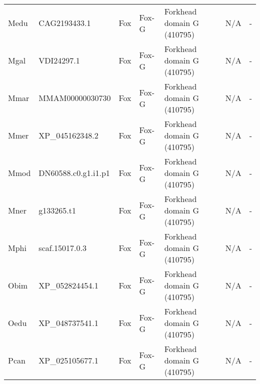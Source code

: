 \documentclass[../main.tex]{subfiles}
\begin{document}
\begin{landscape}
\begin{longtable}{lllllll}
		Medu           & CAG2193433.1          & Fox            & Fox-G               & Forkhead domain G (410795)                  & N/A                                                                    & -                    \\
		Mgal           & VDI24297.1            & Fox            & Fox-G               & Forkhead domain G (410795)                  & N/A                                                                    & -                    \\
		Mmar           & MMAM00000030730       & Fox            & Fox-G               & Forkhead domain G (410795)                  & N/A                                                                    & -                    \\
		Mmer           & XP\_045162348.2       & Fox            & Fox-G               & Forkhead domain G (410795)                  & N/A                                                                    & -                    \\
		Mmod           & DN60588.c0.g1.i1.p1   & Fox            & Fox-G               & Forkhead domain G (410795)                  & N/A                                                                    & -                    \\
		Mner           & g133265.t1            & Fox            & Fox-G               & Forkhead domain G (410795)                  & N/A                                                                    & -                    \\
		Mphi           & scaf.15017.0.3        & Fox            & Fox-G               & Forkhead domain G (410795)                  & N/A                                                                    & -                    \\
		Obim           & XP\_052824454.1       & Fox            & Fox-G               & Forkhead domain G (410795)                  & N/A                                                                    & -                    \\
		Oedu           & XP\_048737541.1       & Fox            & Fox-G               & Forkhead domain G (410795)                  & N/A                                                                    & -                    \\
		Pcan           & XP\_025105677.1       & Fox            & Fox-G               & Forkhead domain G (410795)                  & N/A                                                                    & -                    \\

\end{longtable}
\end{landscape}
\end{document}

